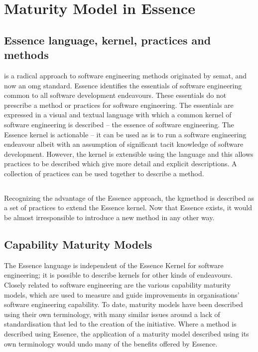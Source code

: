 \pagebreak
\section{Maturity Model in Essence}

\subsection{Essence language, kernel, practices and methods}\label{subsec:essence-language-kernel-practices-and-methods}

 is a radical approach to software engineering methods originated by \gls{semat}, and now an \gls{omg} standard.
Essence identifies the essentials of software engineering common to all software development endeavours.
These essentials do not prescribe a method or practices for software engineering.
The essentials are expressed in a visual and textual language with which a common kernel of software engineering
is described -- the essence of software engineering.
The Essence kernel is actionable -- it can be used as is to run a software engineering endeavour albeit
with an assumption of significant tacit knowledge of software development.
However, the kernel is extensible using the language and this allows practices to be described which give more detail
and explicit descriptions.
A collection of practices can be used together to describe a method.

\subsection{}\label{subsec:agnos-ai-kg-method}

Recognizing the advantage of the Essence approach, the \agnos \gls{kgmethod} is described as
a set of practices to extend the Essence kernel.
Now that Essence exists, it would be almost irresponsible to introduce a new method in any other way.

\subsection{Capability Maturity Models}\label{subsec:capability-maturity-models}

The Essence language is independent of the Essence Kernel for software engineering;
it is possible to describe kernels for other kinds of endeavours.
Closely related to software engineering are the various capability maturity models, which are used to measure and
guide improvements in organisations' software engineering capability.
To date, maturity models have been described using their own terminology, with many similar issues around a lack of
standardisation that led to the creation of the  initiative.
Where a method is described using Essence, the application of a maturity model described using its own
terminology would undo many of the benefits offered by Essence.

